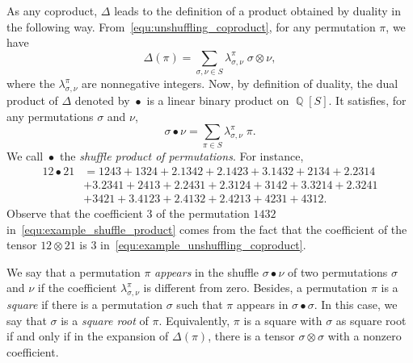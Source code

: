 \documentclass[a4paper,10pt]{llncs}
\DeclareMathOperator{\QQ}{\mathbb{Q}}
\DeclareMathOperator{\SHUFFLE}{\bullet}
\begin{document}
As any coproduct, $\Delta$ leads to the definition of a product obtained
by duality in the following way. From~\eqref{equ:unshuffling_coproduct},
for any permutation $\pi$, we have
\begin{equation}
    \Delta(\pi) =
    \sum_{\sigma, \nu \in S} \lambda_{\sigma, \nu}^\pi \;
    \sigma \otimes \nu,
\end{equation}
where the $\lambda_{\sigma, \nu}^\pi$ are nonnegative integers. Now,
by definition of duality, the dual product of $\Delta$ denoted by
$\SHUFFLE$ is a linear binary product on $\QQ[S]$. It satisfies, for any
permutations
$\sigma$ and $\nu$,
\begin{equation}
    \sigma \SHUFFLE \nu =
    \sum_{\pi \in S}
    \lambda_{\sigma, \nu}^\pi \; \pi.
\end{equation}
We call $\SHUFFLE$ the {\em shuffle product of permutations}. For
instance,
\begin{equation}\begin{split} \label{equ:example_shuffle_product}
    12 \SHUFFLE 21 & =
    1243 + 1324 + 2.1342 + 2.1423 + 3.1432 + 2134 + 2.2314 \\
    & + 3.2341 + 2413 + 2.2431 + 2.3124 + 3142 + 3.3214 + 2.3241 \\
    & + 3421 + 3.4123 + 2.4132 + 2.4213 + 4231 + 4312.
\end{split}\end{equation}
Observe that the coefficient $3$ of the permutation $1432$
in~\eqref{equ:example_shuffle_product} comes from the fact that the
coefficient of the tensor $12 \otimes 21$ is $3$
in~\eqref{equ:example_unshuffling_coproduct}.
\medskip

We say that a permutation $\pi$ {\em appears} in the shuffle
$\sigma \SHUFFLE \nu$ of two permutations $\sigma$ and $\nu$ if the
coefficient $\lambda_{\sigma, \nu}^\pi$ is different from zero.
Besides, a permutation $\pi$ is a {\em square} if there is a permutation
$\sigma$ such that $\pi$ appears in $\sigma \SHUFFLE \sigma$. In this
case, we say that $\sigma$ is a {\em square root} of $\pi$. Equivalently,
$\pi$ is a square with $\sigma$ as square root if and only if in the
expansion of $\Delta(\pi)$, there is a tensor $\sigma \otimes \sigma$
with a nonzero coefficient.
\medskip
\end{document}
